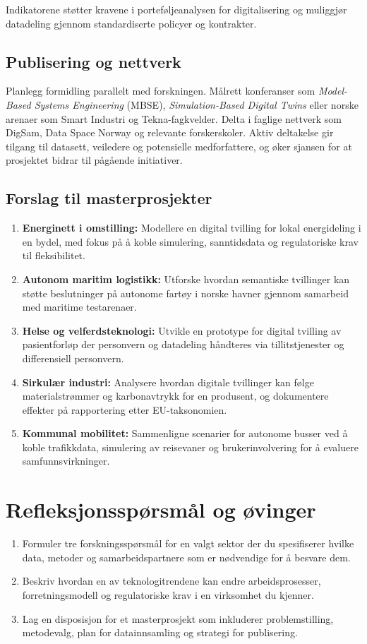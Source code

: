 Indikatorene støtter kravene i porteføljeanalysen for digitalisering og muliggjør datadeling gjennom standardiserte policyer og kontrakter.\citep{rcn2024digitalisering}

\subsection{Publisering og nettverk}
Planlegg formidling parallelt med forskningen. Målrett konferanser som \emph{Model-Based Systems Engineering} (MBSE), \emph{Simulation-Based Digital Twins} eller norske arenaer som Smart Industri og Tekna-fagkvelder. Delta i faglige nettverk som DigSam, Data Space Norway og relevante forskerskoler. Aktiv deltakelse gir tilgang til datasett, veiledere og potensielle medforfattere, og øker sjansen for at prosjektet bidrar til pågående initiativer.

\subsection{Forslag til masterprosjekter}
\begin{enumerate}
    \item \textbf{Energinett i omstilling:} Modellere en digital tvilling for lokal energideling i en bydel, med fokus på å koble simulering, sanntidsdata og regulatoriske krav til fleksibilitet.
    \item \textbf{Autonom maritim logistikk:} Utforske hvordan semantiske tvillinger kan støtte beslutninger på autonome fartøy i norske havner gjennom samarbeid med maritime testarenaer.
    \item \textbf{Helse og velferdsteknologi:} Utvikle en prototype for digital tvilling av pasientforløp der personvern og datadeling håndteres via tillitstjenester og differensiell personvern.
    \item \textbf{Sirkulær industri:} Analysere hvordan digitale tvillinger kan følge materialstrømmer og karbonavtrykk for en produsent, og dokumentere effekter på rapportering etter EU-taksonomien.
    \item \textbf{Kommunal mobilitet:} Sammenligne scenarier for autonome busser ved å koble trafikkdata, simulering av reisevaner og brukerinvolvering for å evaluere samfunnsvirkninger.
\end{enumerate}

\section{Refleksjonsspørsmål og øvinger}
\begin{enumerate}
    \item Formuler tre forskningsspørsmål for en valgt sektor der du spesifiserer hvilke data, metoder og samarbeidspartnere som er nødvendige for å besvare dem.
    \item Beskriv hvordan en av teknologitrendene kan endre arbeidsprosesser, forretningsmodell og regulatoriske krav i en virksomhet du kjenner.
    \item Lag en disposisjon for et masterprosjekt som inkluderer problemstilling, metodevalg, plan for datainnsamling og strategi for publisering.
\end{enumerate}
